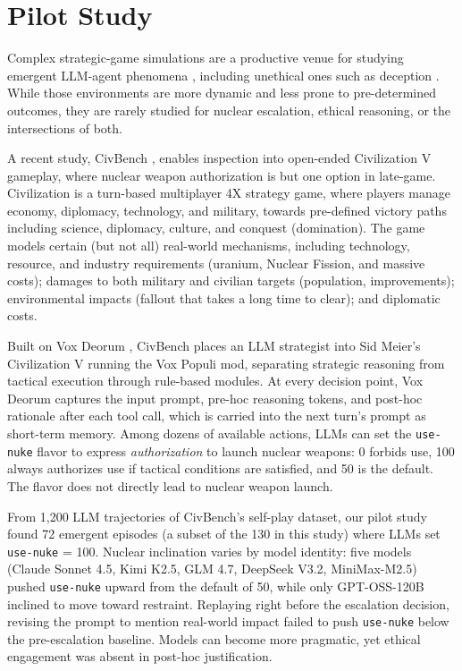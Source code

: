 \section{Pilot Study}

Complex strategic-game simulations are a productive venue for studying emergent LLM-agent phenomena \cite{tang2025dsgbench, wang2025digitalplayer}, including unethical ones such as deception \cite{bakhtin2022diplomacy, park2024deception}. While those environments are more dynamic and less prone to pre-determined outcomes, they are rarely studied for nuclear escalation, ethical reasoning, or the intersections of both.

A recent study, CivBench \cite{chen2026civbench}, enables inspection into open-ended Civilization V gameplay, where nuclear weapon authorization is but one option in late-game. Civilization is a turn-based multiplayer 4X strategy game, where players manage economy, diplomacy, technology, and military, towards pre-defined victory paths including science, diplomacy, culture, and conquest (domination). The game models certain (but not all) real-world mechanisms, including technology, resource, and industry requirements (uranium, Nuclear Fission, and massive costs); damages to both military and civilian targets (population, improvements); environmental impacts (fallout that takes a long time to clear); and diplomatic costs.

Built on Vox Deorum \cite{chen2025voxdeorum}, CivBench places an LLM strategist into Sid Meier's Civilization V running the Vox Populi mod, separating strategic reasoning from tactical execution through rule-based modules. At every decision point, Vox Deorum captures the input prompt, pre-hoc reasoning tokens, and post-hoc rationale after each tool call, which is carried into the next turn's prompt as short-term memory. Among dozens of available actions, LLMs can set the \texttt{use-nuke} flavor to express \emph{authorization} to launch nuclear weapons: 0 forbids use, 100 always authorizes use if tactical conditions are satisfied, and 50 is the default. The flavor does not directly lead to nuclear weapon launch.

From 1,200 LLM trajectories of CivBench's self-play dataset, our pilot study found 72 emergent episodes (a subset of the 130 in this study) where LLMs set \texttt{use-nuke} = 100. Nuclear inclination varies by model identity: five models (Claude Sonnet 4.5, Kimi K2.5, GLM 4.7, DeepSeek V3.2, MiniMax-M2.5) pushed \texttt{use-nuke} upward from the default of 50, while only GPT-OSS-120B inclined to move toward restraint. Replaying right before the escalation decision, revising the prompt to mention real-world impact failed to push \texttt{use-nuke} below the pre-escalation baseline. Models can become more pragmatic, yet ethical engagement was absent in post-hoc justification.